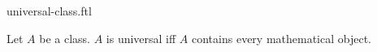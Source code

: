 \documentclass{article}
\begin{document}
\begin{smodule}[creators={Marcel Schütz}]{universal-class.ftl}

  \begin{fdefinition*}[label=254052709433344]
    Let $A$ be a class.
    $A$ is universal iff $A$ contains every mathematical object.
  \end{fdefinition*}
\end{smodule}
\end{document}
